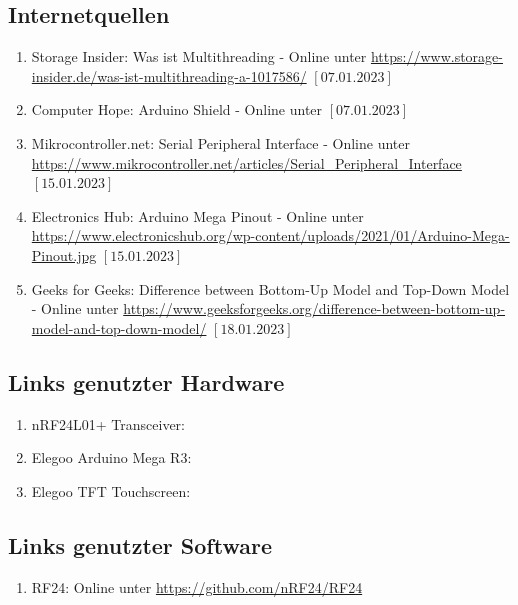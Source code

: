 \documentclass[a4paper, 11pt]{scrartcl}
\begin{document}
\subsection{Internetquellen}
\begin{enumerate}
    \item Storage Insider: Was ist Multithreading - Online unter \url{https://www.storage-insider.de/was-ist-multithreading-a-1017586/} $\left[\text{07.01.2023}\right]$ \label{itm:multithread}
    \item Computer Hope: Arduino Shield - Online unter \url{} $\left[\text{07.01.2023}\right]$ \label{itm:shield}
    \item Mikrocontroller.net: Serial Peripheral Interface - Online unter \url{https://www.mikrocontroller.net/articles/Serial_Peripheral_Interface} $\left[\text{15.01.2023}\right]$ \label{itm:SPI}
    \item Electronics Hub: Arduino Mega Pinout - Online unter \url{https://www.electronicshub.org/wp-content/uploads/2021/01/Arduino-Mega-Pinout.jpg} $\left[\text{15.01.2023}\right]$ \label{itm:pinout}
    \item Geeks for Geeks: Difference between Bottom-Up Model and Top-Down Model - Online unter \url{https://www.geeksforgeeks.org/difference-between-bottom-up-model-and-top-down-model/} 
    $\left[\text{18.01.2023}\right]$ \label{itm:bottom_up}
\end{enumerate}

\subsection{Links genutzter Hardware}\label{ch:hardwarelinks}
\begin{enumerate}
    \item nRF24L01+ Transceiver: \url{}\label{itm:transceiverlink}
    \item Elegoo Arduino Mega R3: \url{}\label{itm:arduinolink}
    \item Elegoo TFT Touchscreen: \url{}\label{itm:tftlink}
\end{enumerate}

\subsection{Links genutzter Software}\label{ch:softwarelinks}
\begin{enumerate}
    \item RF24: Online unter \url{https://github.com/nRF24/RF24}\label{link:rf24}
\end{enumerate}
\end{document}
